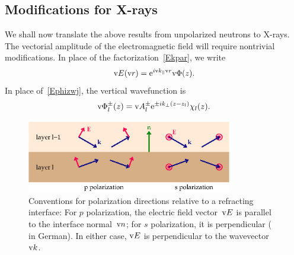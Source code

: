 \subsection{Modifications for X-rays}\label{SmulayX}

\def\Ep{\v{\Phi}}
\def\hn{\v{n}}

We shall now translate the above results from unpolarized neutrons to X-rays.
The vectorial amplitude of the electromagnetic field will require
nontrivial modifications.
In place of the factorization~\cref{Ekpar}, we write
\begin{equation}
  \v{E}(\r)=\e^{i\k_\plll\r}\Ep(z).
\end{equation}
In place of~\cref{Ephizwj},
the vertical wavefunction is
\begin{equation}
  \Ep^\pm_l(z) = \v{A}^\pm_l \e^{\pm ik_\perp(z-z_l)}\chi_l(z).
\end{equation}

\begin{figure}[tb]
\begin{center}
\includegraphics[width=0.8\textwidth]{fig/drawing/s-vs-p-polarization.ps}
\end{center}
\caption{Conventions for polarization directions relative to a refracting interface:
%
%
%
%
For $p$ polarization, the electric field vector~$\text{v}{E}$ is parallel to the interface normal~$\hn$;
for $s$ polarization, it is perpendicular ( in German).
In either case, $\text{v}{E}$ is perpendicular to the wavevector~$\text{v}{k}$.}
\label{Fsppol}
\end{figure}

